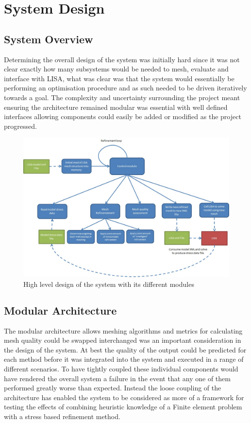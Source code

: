 \section{System Design}

\subsection{System Overview}
Determining the overall design of the system was initially hard since it was not clear exactly how many subsystems would be needed to mesh, evaluate and interface with LISA, what was clear was that the system would essentially be performing an optimisation procedure and as such needed to be driven iteratively towards a goal. The complexity and uncertainty surrounding the project meant ensuring the architecture remained modular was essential with well defined interfaces allowing components could easily be added or modified as the project progressed. \\ 

\begin{figure}[!h]
  \centerline{\includegraphics[width=150mm, scale=1]{../Graphics/SystemDesignDiagram.jpeg}}
  \caption{High level design of the system with its different modules}
  \label{fig:h-refinementImp}
\end{figure}


\subsection{Modular Architecture}
The modular architecture allows meshing algorithms and metrics for calculating mesh quality could be swapped interchanged was an important consideration in the design of the system. At best the quality of the output could be predicted for each method before it was integrated into the system and executed in a range of different scenarios. To have tightly coupled these individual components would have rendered the overall system a failure in the event that any one of them performed greatly worse than expected. Instead the loose coupling of the architecture has enabled the system to be considered as more of a framework for testing the effects of combining heuristic knowledge of a Finite element problem with a stress based refinement method.\\

